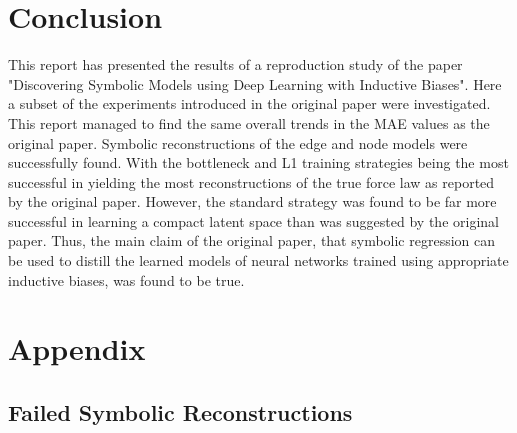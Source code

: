 \documentclass[11pt]{article}
\begin{document}


\section{Conclusion}
This report has presented the results of a reproduction study of the paper "Discovering Symbolic Models using Deep Learning with Inductive Biases". Here a subset of the experiments introduced in the original paper were investigated. This report managed to find the same overall trends in the MAE values as the original paper. Symbolic reconstructions of the edge and node models were successfully found. With the bottleneck and L1 training strategies being the most successful in yielding the most reconstructions of the true force law as reported by the original paper. However, the standard strategy was found to be far more successful in learning a compact latent space than was suggested by the original paper. Thus, the main claim of the original paper, that symbolic regression can be used to distill the learned models of neural networks trained using appropriate inductive biases, was found to be true. 
    
\section{Appendix}
\subsection{Failed Symbolic Reconstructions}
\end{document}
